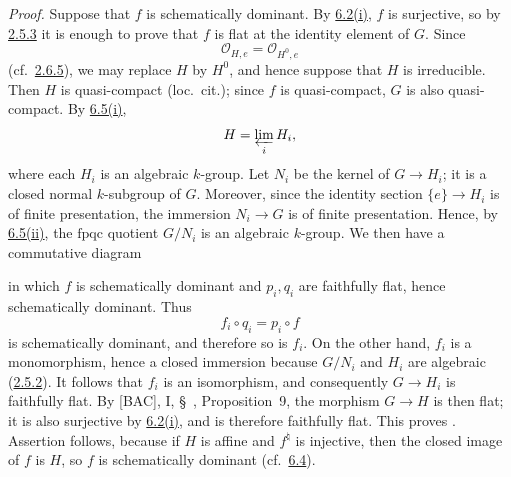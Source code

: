 \emph{Proof.}
Suppose that \(f\) is schematically dominant. By \hyperref[concl:sga3-VIA-6.2-i]{6.2(i)}, \(f\) is
surjective, so by \hyperref[lem:sga3-VIA-2.5.3]{2.5.3} it is enough to prove that \(f\) is flat at
the identity element of \(G\). Since
\[
  \mathcal O_{H,e}=\mathcal O_{H^0,e}
\]
(cf.\ \hyperref[thm:sga3-VIA-2.6.5]{2.6.5}), we may replace \(H\) by \(H^0\), and hence suppose
that \(H\) is irreducible. Then \(H\) is quasi-compact
(loc.\ cit.); since \(f\) is quasi-compact, \(G\) is also
quasi-compact. By \hyperref[concl:sga3-VIA-6.5-i]{6.5(i)},
\[
  H=\varprojlim_i H_i,
\]
where each \(H_i\) is an algebraic \(k\)-group. Let \(N_i\) be the
kernel of \(G\to H_i\); it is a closed normal \(k\)-subgroup of
\(G\). Moreover, since the identity section
\(\{e\}\to H_i\) is of finite presentation, the immersion
\(N_i\to G\) is of finite presentation. Hence, by \hyperref[concl:sga3-VIA-6.5-ii]{6.5(ii)}, the
\(\mathrm{fpqc}\) quotient \(G/N_i\) is an algebraic \(k\)-group.
We then have a commutative diagram
\begin{center}
  \label{diag:sga3-VIA-6.6-square}%
\end{center}
in which \(f\) is schematically dominant and \(p_i,q_i\) are
faithfully flat, hence schematically dominant. Thus
\[
  f_i\circ q_i=p_i\circ f
\]
is schematically dominant, and therefore so is \(f_i\). On the
other hand, \(f_i\) is a monomorphism, hence a closed immersion
because \(G/N_i\) and \(H_i\) are algebraic (\hyperref[prop:sga3-VIA-2.5.2]{2.5.2}). It follows that
\(f_i\) is an isomorphism, and consequently \(G\to H_i\) is
faithfully flat. By \textup{[BAC]}, I, \S~, Proposition~9, the
morphism \(G\to H\) is then flat; it is also surjective by \hyperref[concl:sga3-VIA-6.2-i]{6.2(i)},
and is therefore faithfully flat. This proves . Assertion 
follows, because if \(H\) is affine and \(f^\natural\) is
injective, then the closed image of \(f\) is \(H\), so \(f\) is
schematically dominant (cf.\ \hyperref[prop:sga3-VIA-6.4]{6.4}).

